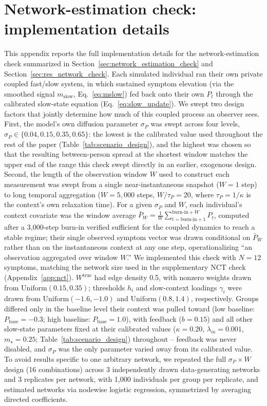 \documentclass[man,12pt,floatsintext]{apa7}
\begin{document}
\section{Network-estimation check: implementation details}\label{app:network_check_details}
This appendix reports the full implementation details for the network-estimation check
summarized in Section~\ref{sec:network_estimation_check} and Section~\ref{sec:res_network_check}.
Each simulated individual ran their own private coupled fast/slow system, in which sustained
symptom elevation (via the smoothed signal \(m_{\text{slow}}\), Eq.~\eqref{eq:mslow}) fed back
onto their own \(P_t\) through the calibrated slow-state equation (Eq.~\eqref{eq:slow_update}). We
swept two design factors that jointly determine how much of this coupled process an observer sees.
First, the model's own diffusion parameter \(\sigma_P\) was swept across four levels,
\(\sigma_P\in\{0.04,0.15,0.35,0.65\}\): the lowest is the calibrated value used throughout the
rest of the paper (Table~\ref{tab:scenario_design}), and the highest was chosen so that the
resulting between-person spread at the shortest window matches the upper end of the range this
check swept directly in an earlier, exogenous design. Second, the length of the observation window
\(W\) used to construct each measurement was swept from a single near-instantaneous snapshot
(\(W=1\) step) to long temporal aggregation (\(W=5{,}000\) steps, \(W/\tau_P=20\), where
\(\tau_P=1/\kappa\) is the context's own relaxation time). For a given \(\sigma_P\) and \(W\), each
individual's context covariate was the window average
\(\bar P_W=\frac{1}{W}\sum_{t=\text{burn-in}+1}^{\text{burn-in}+W}P_t\), computed after a
3{,}000-step burn-in verified sufficient for the coupled dynamics to reach a stable regime; their
single observed symptom vector was drawn conditional on \(\bar P_W\) rather than on the
instantaneous context at any one step, operationalizing ``an observation aggregated over window
\(W\).''
We implemented this check with \(N=12\) symptoms, matching the network size used in the
supplementary NCT check (Appendix~\ref{app:nct}). \(W^{\mathrm{true}}\) had edge density 0.5, with
nonzero weights drawn from \(\mathrm{Uniform}(0.15,0.35)\); thresholds \(h_i\) and slow-context
loadings \(\gamma_i\) were drawn from \(\mathrm{Uniform}(-1.6,-1.0)\) and \(\mathrm{Uniform}(0.8,1.4)\),
respectively. Groups differed only in the baseline level their context was pulled toward (low
baseline: \(P_{\text{base}}=-0.3\); high baseline: \(P_{\text{base}}=1.0\)), with feedback
(\(b=0.15\)) and all other slow-state parameters fixed at their calibrated values
(\(\kappa=0.20\), \(\lambda_m=0.001\), \(m_\star=0.25\); Table~\ref{tab:scenario_design}) throughout
-- feedback was never disabled, and \(\sigma_P\) was the only parameter varied away from its
calibrated value. To avoid results specific to one arbitrary network, we repeated the full
\(\sigma_P\times W\) design (16 combinations) across 3 independently drawn data-generating
networks and 3 replicates per network, with 1{,}000 individuals per group per replicate, and
estimated networks via nodewise logistic regression, symmetrized by averaging directed
coefficients.
\end{document}
